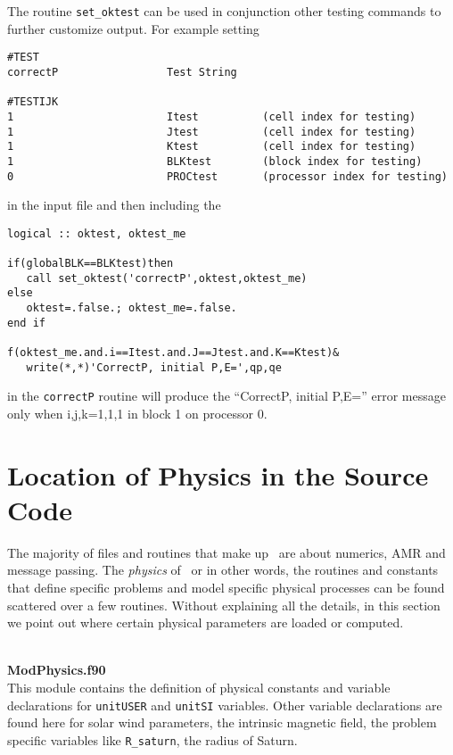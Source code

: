 The routine {\tt set\_oktest} can be used in conjunction other testing commands to 
further customize output.  For example setting
\begin{verbatim}
#TEST  
correctP                 Test String

#TESTIJK
1                        Itest          (cell index for testing)
1                        Jtest          (cell index for testing)
1                        Ktest          (cell index for testing)
1                        BLKtest        (block index for testing)
0                        PROCtest       (processor index for testing)
\end{verbatim}
in the input file and then including the 
\begin{verbatim}
logical :: oktest, oktest_me

if(globalBLK==BLKtest)then
   call set_oktest('correctP',oktest,oktest_me)
else
   oktest=.false.; oktest_me=.false.
end if

f(oktest_me.and.i==Itest.and.J==Jtest.and.K==Ktest)&
   write(*,*)'CorrectP, initial P,E=',qp,qe
\end{verbatim}
in the {\tt correctP} routine will produce the ``CorrectP, initial P,E=''
error message only when {i,j,k=1,1,1} in block 1 on processor 0.  

\section{Location of Physics in the Source Code \label{section:locating_physics}}

The majority of files and routines that make up \BATSRUS\ are about numerics,
AMR and message passing.  The {\em physics} of \BATSRUS\, or in other words, the
routines and constants that define specific problems and model specific physical
processes can be found scattered over a few routines.  Without explaining
all the details, in this section we point out where certain physical parameters
are loaded or computed.


\ \ \\
{\bf ModPhysics.f90} \\
This module contains the definition of physical constants and variable declarations
for {\tt unitUSER} and {\tt unitSI} variables.  Other variable declarations are found
here for solar wind parameters, the intrinsic magnetic field, the problem specific
variables like {\tt R\_saturn}, the radius of Saturn.

